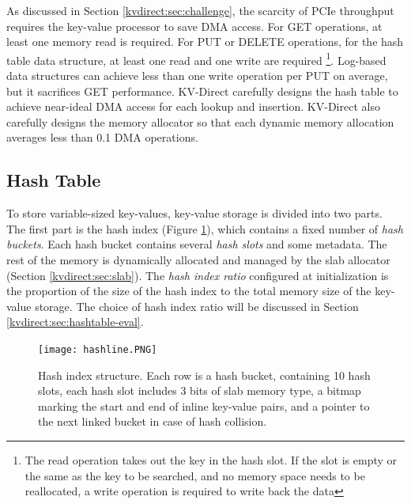 As discussed in Section \ref {kvdirect:sec:challenge}, the scarcity of PCIe throughput requires the key-value processor to save DMA access. For GET operations, at least one memory read is required. For PUT or DELETE operations, for the hash table data structure, at least one read and one write are required \footnote{The read operation takes out the key in the hash slot. If the slot is empty or the same as the key to be searched, and no memory space needs to be reallocated, a write operation is required to write back the data}. Log-based data structures can achieve less than one write operation per PUT on average, but it sacrifices GET performance. KV-Direct carefully designs the hash table to achieve near-ideal DMA access for each lookup and insertion. KV-Direct also carefully designs the memory allocator so that each dynamic memory allocation averages less than 0.1 DMA operations.

\subsection{Hash Table}
\label{kvdirect:sec:hashtable}

To store variable-sized key-values, key-value storage is divided into two parts. The first part is the hash index (Figure \ref {kvdirect:fig:hashtable}), which contains a fixed number of \textit {hash buckets}. Each hash bucket contains several \textit {hash slots} and some metadata. The rest of the memory is dynamically allocated and managed by the slab allocator (Section \ref {kvdirect:sec:slab}). The \textit {hash index ratio} configured at initialization is the proportion of the size of the hash index to the total memory size of the key-value storage. The choice of hash index ratio will be discussed in Section \ref {kvdirect:sec:hashtable-eval}.

\begin{figure}[htbp]
	\centering
	\texttt{[image: hashline.PNG]}
	\caption{Hash index structure. Each row is a hash bucket, containing 10 hash slots, each hash slot includes 3 bits of slab memory type, a bitmap marking the start and end of inline key-value pairs, and a pointer to the next linked bucket in case of hash collision.}
	\label{kvdirect:fig:hashtable}
\end{figure}


